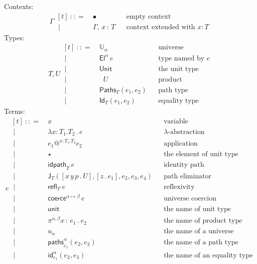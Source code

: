 \documentclass{article}
\makeatletter
\newcommand{\G}{\Gamma} %
\newcommand{\T}{T} %
\newcommand{\U}{U} %
\newcommand{\x}{x} %
\newcommand{\e}{e} %
\newcommand{\bnf}{\ \mathrel{{:}{:}{=}}\ }
\newcommand{\bnfor}{\ \mid\ \ }
\newcommand{\ctxempty}{\bullet} %
\newcommand{\ctxextend}[3]{#1,\, #2\, {:}\, #3} %
\newcommand{\Universe}[1]{\mathbb{U}_{#1}} %
\newcommand{\El}[2]{\mathsf{El}^{#1}\, #2} %
\newcommand{\Unit}{\mathsf{Unit}} %
\newcommand{\Prod}[2]{\mathop{\textstyle\prod_{(#1 {:} #2)}}} %
\newcommand{\lam}[3]{\lambda #1 {:} #2.{#3}\,.\,} %
\newcommand{\app}[5]{#1\mathbin{@^{#2{:}#3.#4}} #5} %
\newcommand{\abst}[2]{[#1 \,.\, #2]} %
\newcommand{\unitTerm}{\star} %
\newcommand{\coerce}[3]{\mathsf{coerce}^{#1{\mapsto}#2} \, #3}
\newcommand{\PrEqual}[3]{\mathsf{Paths}_{#1}(#2,#3)} %
\newcommand{\JuEqual}[3]{\mathsf{Id}_{#1}(#2,#3)} %
\newcommand{\PrElim}[6]{\mathsf{J}_{#1}(#2, #3, #4, #5, #6)} %
\newcommand{\prRefl}[1]{{\mathsf{idpath}_{#1}}\ }  %
\newcommand{\juRefl}[1]{{\mathsf{refl}_{#1}}\ }    %
\newcommand{\nUnit}{\mathsf{unit}} %
\newcommand{\nProd}[4]{\pi^{#1,#2} #3\,{:}\,#4 \,.\ } %
\newcommand{\nUniverse}[1]{u_{#1}}  %
\newcommand{\nPrEqual}[4]{\mathsf{paths}^{#1}_{#2}(#3,#4)} %
\newcommand{\nJuEqual}[4]{\mathsf{id}^{#1}_{#2}(#3,#4)} %
\makeatother
\begin{document}
Contexts:
%
\begin{equation*}
  \G
  \begin{aligned}[t]
    \bnf   {}& \ctxempty & & \text{empty context}\\
    \bnfor {}& \ctxextend{\G}{\x}{\T} & & \text{context extended with $x : T$}
  \end{aligned}
\end{equation*}
%
Types:
%
\begin{equation*}
  \T, \U
  \begin{aligned}[t]
    \bnf   {}& \Universe{\alpha} & & \text{universe}\\
    \bnfor {}& \El{\alpha}{\e} & & \text{type named by $e$}\\
    \bnfor {}& \Unit & & \text{the unit type}\\
    \bnfor {}& \Prod{x}{\T} \U & & \text{product}\\
    \bnfor {}& \PrEqual{T}{\e_1}{\e_2} & & \text{path type}\\
    \bnfor {}& \JuEqual{T}{\e_1}{\e_2} & & \text{equality type}
  \end{aligned}
\end{equation*}
%
Terms:
%
\begin{equation*}
  \e
  \begin{aligned}[t]
    \bnf   {}&  \x   &&\text{variable} \\
    \bnfor {}&  \lam{\x}{\T_1}{\T_2} \e  &&\text{$\lambda$-abstraction} \\
    \bnfor {}&  \app{\e_1}{\x}{\T_1}{\T_2}{\e_2}  &&\text{application} \\
    \bnfor {}&  \unitTerm  &&\text{the element of unit type} \\
    \bnfor {}&  \prRefl{\T}{\e}  &&\text{identity path} \\
    \bnfor {}&  \PrElim{\T}{\abst{x\,y\,p}{\U}}{\abst{z}{\e_1}}{\e_2}{\e_3}{\e_4}  &&\text{path eliminator} \\
    \bnfor {}&  \juRefl{\T} \e  &&\text{reflexivity} \\
    \bnfor {}&  \coerce{\alpha}{\beta}{\e}  &&\text{universe coercion} \\
    \bnfor {}&  \nUnit  &&\text{the name of unit type} \\
    \bnfor {}&  \nProd{\alpha}{\beta}{\x}{\e_1} \e_2  &&\text{the name of product type} \\
    \bnfor {}&  \nUniverse{\alpha} &&\text{the name of a universe} \\
    \bnfor {}&  \nPrEqual{\alpha}{\e_1}{\e_2}{\e_3}  &&\text{the name of a path type} \\
    \bnfor {}&  \nJuEqual{\alpha}{\e_1}{\e_2}{\e_3}  &&\text{the name of an equality type}
  \end{aligned}
\end{equation*}
\end{document}
